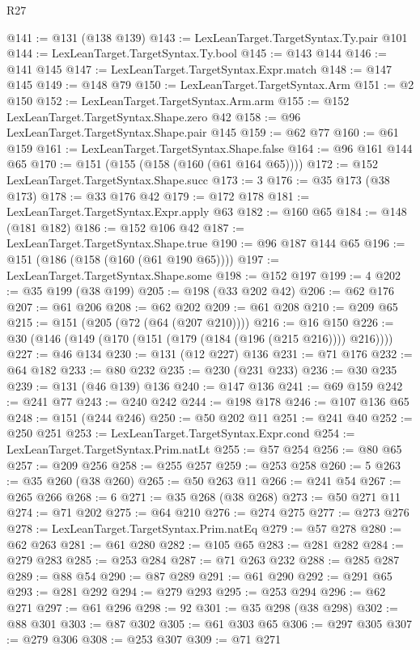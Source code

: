 \begin{lexlean}{R27}
\begin{coremodule}
@141 := @131 (@138 @139)
@143 := LexLeanTarget.TargetSyntax.Ty.pair @101
@144 := LexLeanTarget.TargetSyntax.Ty.bool
@145 := @143 @144
@146 := @141 @145
@147 := LexLeanTarget.TargetSyntax.Expr.match
@148 := @147 @145
@149 := @148 @79
@150 := LexLeanTarget.TargetSyntax.Arm
@151 := @2 @150
@152 := LexLeanTarget.TargetSyntax.Arm.arm
@155 := @152 LexLeanTarget.TargetSyntax.Shape.zero @42
@158 := @96 LexLeanTarget.TargetSyntax.Shape.pair @145
@159 := @62 @77
@160 := @61 @159
@161 := LexLeanTarget.TargetSyntax.Shape.false
@164 := @96 @161 @144 @65
@170 := @151 (@155 (@158 (@160 (@61 @164 @65))))
@172 := @152 LexLeanTarget.TargetSyntax.Shape.succ
@173 := 3
@176 := @35 @173 (@38 @173)
@178 := @33 @176 @42
@179 := @172 @178
@181 := LexLeanTarget.TargetSyntax.Expr.apply @63
@182 := @160 @65
@184 := @148 (@181 @182)
@186 := @152 @106 @42
@187 := LexLeanTarget.TargetSyntax.Shape.true
@190 := @96 @187 @144 @65
@196 := @151 (@186 (@158 (@160 (@61 @190 @65))))
@197 := LexLeanTarget.TargetSyntax.Shape.some
@198 := @152 @197
@199 := 4
@202 := @35 @199 (@38 @199)
@205 := @198 (@33 @202 @42)
@206 := @62 @176
@207 := @61 @206
@208 := @62 @202
@209 := @61 @208
@210 := @209 @65
@215 := @151 (@205 (@72 (@64 (@207 @210))))
@216 := @16 @150
@226 := @30 (@146 (@149 (@170 (@151 (@179 (@184 (@196 (@215 @216)))) @216))))
@227 := @46 @134
@230 := @131 (@12 @227) @136
@231 := @71 @176
@232 := @64 @182
@233 := @80 @232
@235 := @230 (@231 @233)
@236 := @30 @235
@239 := @131 (@46 @139) @136
@240 := @147 @136
@241 := @69 @159
@242 := @241 @77
@243 := @240 @242
@244 := @198 @178
@246 := @107 @136 @65
@248 := @151 (@244 @246)
@250 := @50 @202 @11
@251 := @241 @40
@252 := @250 @251
@253 := LexLeanTarget.TargetSyntax.Expr.cond
@254 := LexLeanTarget.TargetSyntax.Prim.natLt
@255 := @57 @254
@256 := @80 @65
@257 := @209 @256
@258 := @255 @257
@259 := @253 @258
@260 := 5
@263 := @35 @260 (@38 @260)
@265 := @50 @263 @11
@266 := @241 @54
@267 := @265 @266
@268 := 6
@271 := @35 @268 (@38 @268)
@273 := @50 @271 @11
@274 := @71 @202
@275 := @64 @210
@276 := @274 @275
@277 := @273 @276
@278 := LexLeanTarget.TargetSyntax.Prim.natEq
@279 := @57 @278
@280 := @62 @263
@281 := @61 @280
@282 := @105 @65
@283 := @281 @282
@284 := @279 @283
@285 := @253 @284
@287 := @71 @263 @232
@288 := @285 @287
@289 := @88 @54
@290 := @87 @289
@291 := @61 @290
@292 := @291 @65
@293 := @281 @292
@294 := @279 @293
@295 := @253 @294
@296 := @62 @271
@297 := @61 @296
@298 := 92
@301 := @35 @298 (@38 @298)
@302 := @88 @301
@303 := @87 @302
@305 := @61 @303 @65
@306 := @297 @305
@307 := @279 @306
@308 := @253 @307
@309 := @71 @271

\end{coremodule}
\end{lexlean}
